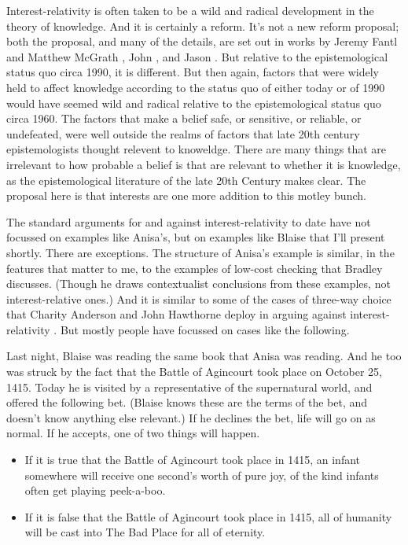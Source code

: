 \documentclass[11pt,]{book}
\providecommand{\tightlist}{%
  \setlength{\itemsep}{0pt}\setlength{\parskip}{0pt}}
\begin{document}
Interest-relativity is often taken to be a wild and radical development in the theory of knowledge. And it is certainly a reform. It's not a new reform proposal; both the proposal, and many of the details, are set out in works by Jeremy Fantl and Matthew McGrath \citetext{\citeyear{FantlMcGrath2002}; \citeyear{FantlMcGrath2009}}, John \citet{Hawthorne2004}, and Jason \citet{Stanley2005}. But relative to the epistemological status quo circa 1990, it is different. But then again, factors that were widely held to affect knowledge according to the status quo of either today or of 1990 would have seemed wild and radical relative to the epistemological status quo circa 1960. The factors that make a belief safe, or sensitive, or reliable, or undefeated, were well outside the realms of factors that late 20th century epistemologists thought relevent to knoweldge. There are many things that are irrelevant to how probable a belief is that are relevant to whether it is knowledge, as the epistemological literature of the late 20th Century makes clear. The proposal here is that interests are one more addition to this motley bunch.

The standard arguments for and against interest-relativity to date have not focussed on examples like Anisa's, but on examples like Blaise that I'll present shortly. There are exceptions. The structure of Anisa's example is similar, in the features that matter to me, to the examples of low-cost checking that Bradley \citet{ArmourGarb2011} discusses. (Though he draws contextualist conclusions from these examples, not interest-relative ones.) And it is similar to some of the cases of three-way choice that Charity Anderson and John Hawthorne deploy in arguing against interest-relativity \citetext{\citeyear{AndersonHawthorne2019a}; \citeyear{AndersonHawthorne2019b}}. But mostly people have focussed on cases like the following.

Last night, Blaise was reading the same book that Anisa was reading. And he too was struck by the fact that the Battle of Agincourt took place on October 25, 1415. Today he is visited by a representative of the supernatural world, and offered the following bet. (Blaise knows these are the terms of the bet, and doesn't know anything else relevant.) If he declines the bet, life will go on as normal. If he accepts, one of two things will happen.

\begin{itemize}
\tightlist
\item
  If it is true that the Battle of Agincourt took place in 1415, an infant somewhere will receive one second's worth of pure joy, of the kind infants often get playing peek-a-boo.
\item
  If it is false that the Battle of Agincourt took place in 1415, all of humanity will be cast into The Bad Place for all of eternity.
\end{itemize}
\end{document}
